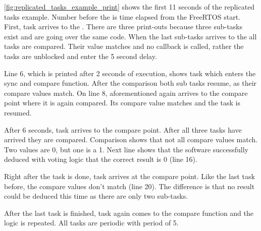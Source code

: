 \autoref{fig:replicated_tasks_example_print} shows the first 11 seconds of the replicated tasks example. Number before the  is time elapsed from the FreeRTOS start. First, task  arrives to the . There are three print-outs because three sub-tasks exist and are going over the same code. When the last sub-tasks arrives to the  all tasks are compared. Their value matches and no callback is called, rather the tasks are unblocked and enter the 5 second delay.

Line 6, which is printed after 2 seconds of execution, shows  task which enters the sync and compare function. After the comparison both sub tasks resume, as their compare values match. On line 8, aforementioned  again arrives to the compare point where it is again compared. Its compare value matches and the task is resumed.

After 6 seconds, task  arrives to the compare point. After all three tasks have arrived they are compared. Comparison shows that not all compare values match. Two values are 0, but one is a 1. Next line shows that the software successfully deduced with voting logic that the correct result is 0 (line 16).

Right after the task  is done, task  arrives at the compare point. Like the last task before, the compare values don't match (line 20). The difference is that no result could be deduced this time as there are only two sub-tasks.

After the last task is finished, task  again comes to the compare function and the logic is repeated. All tasks are periodic with period of 5.

